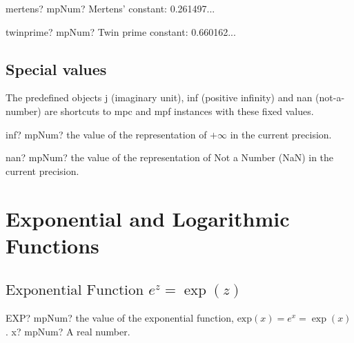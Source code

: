 \vspace{0.6cm}

\begin{mpFunctionsExtract}
	\mpFunctionZero
	{mertens? mpNum?  Mertens' constant: 0.261497...}
\end{mpFunctionsExtract}


\vspace{0.6cm}

\begin{mpFunctionsExtract}
	\mpFunctionZero
	{twinprime? mpNum?  Twin prime constant: 0.660162...}
\end{mpFunctionsExtract}


\subsection{Special values}

The predefined objects j (imaginary unit), inf (positive infinity) and nan (not-a-number) are shortcuts to mpc and mpf instances with these fixed values.

\begin{mpFunctionsExtract}
	\mpFunctionZero
	{inf? mpNum? the value of the representation of  $+\infty$ in the current precision.}
\end{mpFunctionsExtract}

\vspace{0.6cm}


\begin{mpFunctionsExtract}
	\mpFunctionZero
	{nan? mpNum? the value of the representation of Not a Number (NaN) in the current precision.}
\end{mpFunctionsExtract}



\newpage
\section{Exponential and Logarithmic Functions}
\label{ExponentialAndLogarithmCplx}


\subsection{\texorpdfstring{$\text{Exponential Function }e^z = \exp(z)$}{exp}}

\begin{mpFunctionsExtract}
	\mpWorksheetFunctionOneNotImplemented
	{EXP? mpNum? the value of the exponential function, $\text{exp}(x) = e^x = \exp(x)$.}
	{x? mpNum? A real number.}
\end{mpFunctionsExtract}

